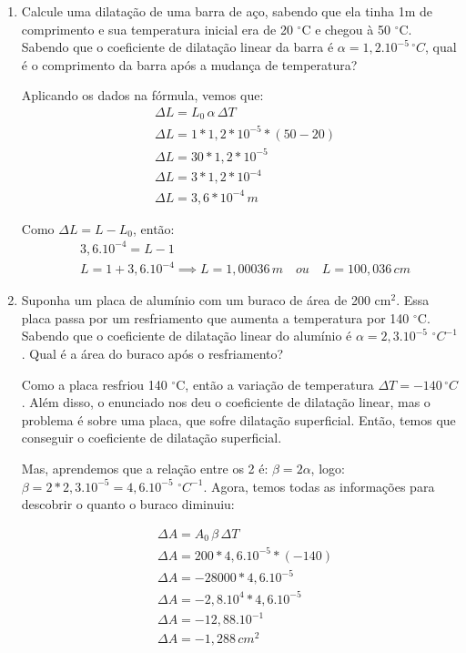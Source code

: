 \documentclass[12pt]{extarticle}
\newcommand{\<}{\langle}
\newcommand{\grad}{$^\circ$}
\renewcommand{\>}{\rangle}
\theoremstyle{definition}
\begin{document}
\begin{enumerate}
    \item Calcule uma dilatação de uma barra de aço, sabendo que ela tinha 1m de comprimento e sua temperatura inicial era de 20 \grad C e chegou à 50 \grad C. Sabendo que o coeficiente de dilatação linear da barra é $\alpha = 1,2.10^{-5}\, ^\circ C$, qual é o comprimento da barra após a mudança de temperatura?

Aplicando os dados na fórmula, vemos que:
\begin{align*}
    &\Delta L = L_0\,\alpha\, \Delta T \\
    &\Delta L = 1*1,2*10^{-5}*(50-20) \\
    &\Delta L = 30*1,2*10^{-5}\\
    &\Delta L = 3*1,2*10^{-4}\\
    &\Delta L = 3,6*10^{-4}\, m
\end{align*}

Como $\Delta L = L - L_0$, então:
\begin{align*}
    &3,6.10^{-4} = L - 1\\
    &L = 1 + 3,6.10^{-4} \implies \boxed{L = 1,00036\, m}\quad ou\quad \boxed{L = 100,036\, cm}
\end{align*}

\item Suponha um placa de alumínio com um buraco de área de 200 cm$^2$. Essa placa passa por um resfriamento que aumenta a temperatura por 140 \grad C. Sabendo que o coeficiente de dilatação linear do alumínio é $\alpha = 2,3.10^{-5} \,\, ^\circ C^{-1}$. Qual é a área do buraco após o resfriamento?

Como a placa resfriou 140 \grad C, então a variação de temperatura $\Delta T = -140\, ^\circ C$. Além disso, o enunciado nos deu o coeficiente de dilatação linear, mas o problema é sobre uma placa, que sofre dilatação superficial. Então, temos que conseguir o coeficiente de dilatação superficial.

Mas, aprendemos que a relação entre os 2 é: $\beta = 2\alpha$, logo: $\beta = 2*2,3.10^{-5} = 4,6.10^{-5}\,\, ^\circ C^{-1}$. Agora, temos todas as informações para descobrir o quanto o buraco diminuiu:

\begin{align*}
    &\Delta A = A_0\,\beta\,\Delta T \\
    &\Delta A = 200*4,6.10^{-5}*(-140)\\
    & \Delta A = -28000*4,6.10^{-5}\\
    &\Delta A = -2,8.10^4*4,6.10^{-5}\\
    &\Delta A = -12,88.10^{-1}\\
    &\Delta A = -1,288\, cm^2
\end{align*}


\end{enumerate}
\end{document}
